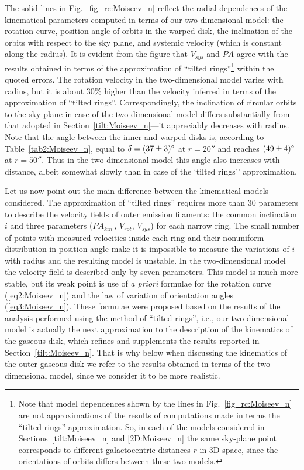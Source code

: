 \documentclass{ab}
\def\degr{\hbox{$^\circ$}}
\def\pak{$PA_{kin}$\,}
\begin{document}
The solid lines in Fig.~\ref{fig_rc:Moiseev_n} reflect the radial
dependences of the kinematical parameters computed in terms of our
two-dimensional model: the rotation curve, position angle of
orbits in the warped disk, the inclination of the orbits with
respect to the sky plane, and systemic velocity (which is constant
along the radius). It is evident from the figure that  $V_{sys}$
and $PA$ agree with the results obtained in terms of the
approximation of ``tilted rings''\footnote{Note that model
dependences shown by the lines in Fig.~\ref{fig_rc:Moiseev_n}  are
not approximations of the results of computations made in terms
the ``tilted rings'' approximation. So, in each of
the models considered in Sections~\ref{tilt:Moiseev_n} and
\ref{2D:Moiseev_n} the same sky-plane point corresponds to
different galactocentric distances $r$ in 3D space, since the
orientations of orbits differs between these two models.} within the
quoted errors. The rotation velocity in the two-dimensional model
varies with radius, but it is about 30\% higher than the velocity
inferred in terms of the approximation of ``tilted rings''.
Correspondingly, the inclination of circular orbits to the sky
plane in case of the two-dimensional model differs substantially
from that adopted in Section~\ref{tilt:Moiseev_n}---it appreciably
decreases with radius. Note that the angle between the inner and
warped disks is, according to Table~\ref{tab2:Moiseev_n}, equal to
$\delta=(37\pm3)\degr$ at $r=20''$ and reaches  $(49\pm4)\degr$ at
$r=50''$. Thus in the two-dimensional model this angle also
increases with distance, albeit somewhat slowly than in case of
the `tilted rings'' approximation.

Let us now point out the main difference between the kinematical
models considered. The approximation of ``tilted rings'' requires
more than 30 parameters to describe the velocity fields of outer
emission filaments: the common inclination $i$ and three
parameters (\pak, $V_{rot}$, $V_{sys}$) for each narrow ring. The
small number of points with measured velocities inside each ring
and their nonuniform distribution in position angle make it is
impossible to measure the variations of  $i$ with 
radius and the resulting model is unstable. In the two-dimensional
model the velocity field is described only by seven parameters.
This model is much more stable, but its weak point is use of {\it
a priori} formulae for the rotation curve (\ref{eq2:Moiseev_n})
and the law of variation of orientation angles
(\ref{eq3:Moiseev_n}). These formulae were proposed based on the
results of the analysis performed using the method of ``tilted
rings'', i.e., our two-dimensional model is actually the next
approximation to the description of the kinematics of the gaseous
disk, which refines and supplements the results reported in
Section~\ref{tilt:Moiseev_n}. That is why below when discussing
the kinematics of the outer gaseous disk we refer to the results
obtained in terms of the two-dimensional model, since we consider
it to be more realistic.
\end{document}
